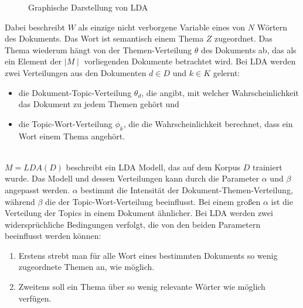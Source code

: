 \documentclass[german,version-2020-11]{uzl-thesis}
\begin{document}
\begin{figure}[h]
\centering
{}\caption{Graphische Darstellung von LDA}
\label{fig:ldagraphic}
\end{figure}

Dabei beschreibt $W$ als einzige nicht verborgene Variable eines von $N$ Wörtern des Dokuments. Das Wort ist semantisch einem Thema $Z$ zugeordnet. Das Thema wiederum hängt von der Themen-Verteilung $\theta$ des Dokuments ab, das als ein Element der $\mid M \mid$ vorliegenden Dokumente betrachtet wird. Bei LDA werden zwei Verteilungen aus den Dokumenten $d \in D$ und $k \in K$ gelernt: 

\begin{itemize}
\item die Dokument-Topic-Verteilung $\theta_d$, die angibt, mit welcher Wahrscheinlichkeit das Dokument zu jedem Themen gehört und 
\item die Topic-Wort-Verteilung $\phi_k$, die die Wahrscheinlichkeit berechnet, dass ein Wort einem Thema angehört. 
\end{itemize}\\

$M = LDA(D)$ beschreibt ein LDA Modell, das auf dem Korpus $D$ trainiert wurde. Das Modell und dessen Verteilungen kann durch die Parameter $\alpha$ und $\beta$ angepasst werden. $\alpha$ bestimmt die Intensität der Dokument-Themen-Verteilung, während $\beta$ die der Topic-Wort-Verteilung beeinflusst. Bei einem großen $\alpha$ ist die Verteilung der Topics in einem Dokument ähnlicher. Bei LDA werden zwei widersprüchliche Bedingungen verfolgt, die von den beiden Parametern beeinflusst werden können:
\begin{enumerate}
\item Erstens strebt man für alle Wort eines bestimmten Dokuments so wenig zugeordnete Themen an, wie möglich.
\item Zweitens soll ein Thema über so wenig relevante Wörter wie möglich verfügen.
\end{enumerate}\\
\end{document}
